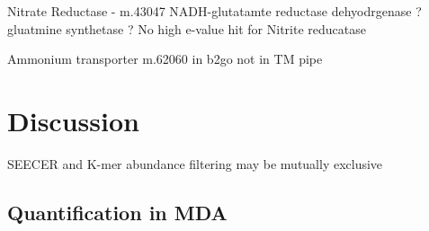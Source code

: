Nitrate Reductase - m.43047  
NADH-glutatamte reductase dehyodrgenase ?
gluatmine synthetase ?
No high e-value hit for Nitrite reducatase

Ammonium transporter m.62060 in b2go not in TM pipe











\section{Discussion}

SEECER and K-mer abundance filtering may be mutually exclusive

\subsection{Quantification in MDA}




